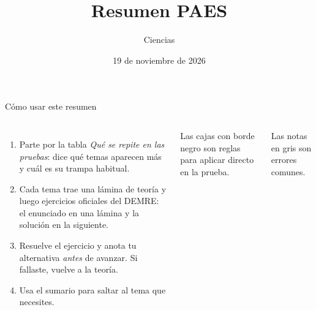 \documentclass[aspectratio=169,11pt]{beamer}
\title[Resumen PAES: Ciencias]{Resumen PAES}
\subtitle{Ciencias}
\date{19 de noviembre de 2026}
\begin{document}
\begin{frame}[plain]
  \titlepage
\end{frame}

\begin{frame}{Cómo usar este resumen}
\begin{columns}[T,onlytextwidth]
\small
\begin{enumerate}
\item Parte por la tabla \emph{Qué se repite en las pruebas}: dice qué temas aparecen más y cuál es su trampa habitual.
\item Cada tema trae una lámina de teoría y luego ejercicios oficiales del DEMRE: el enunciado en una lámina y la solución en la siguiente.
\item Resuelve el ejercicio y anota tu alternativa \emph{antes} de avanzar. Si fallaste, vuelve a la teoría.
\item Usa el sumario para saltar al tema que necesites.
\end{enumerate}
\begin{cajaregla}\footnotesize Las cajas con borde negro son reglas para aplicar directo en la prueba.\end{cajaregla}
\begin{notagris}\footnotesize Las notas en gris son errores comunes.\end{notagris}
\end{columns}
\end{frame}
\end{document}

